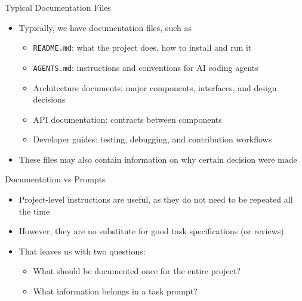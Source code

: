 \documentclass[
ps,
]{prosper}
\begin{document}
\begin{slide}{Typical Documentation Files}

\begin{itemize}

\item Typically, we have documentation files, such as

  \begin{itemize}
    
  \item \texttt{README.md}: what the project does, how to install and run it

  \item \texttt{AGENTS.md}: instructions and conventions for AI coding agents

  \item Architecture documents: major components, interfaces, and design decisions
    
  \item API documentation: contracts between components

  \item Developer guides: testing, debugging, and contribution workflows
    
  \end{itemize}

\item These files may also contain information on why certain decision were made
  
\end{itemize}
  
\end{slide}



\begin{slide}{Documentation vs Prompts}

\begin{itemize}

\item Project-level instructions are useful, as they do not need to be
  repeated all the time

\item However, they are no substitute for good task specifications (or
  reviews)

\item That leaves us with two questions:

  \begin{itemize}
    
  \item What should be documented once for the entire project?

  \item What information belongs in a task prompt?
    
  \end{itemize}

\end{itemize}
  
\end{slide}
\end{document}
